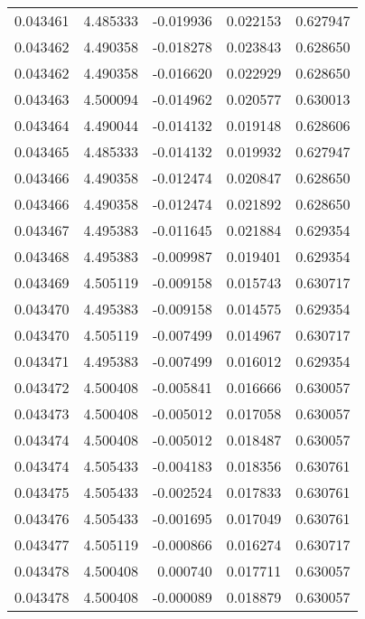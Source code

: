 \begin{tabular}{lrrrr}
0.043461    &  4.485333 & -0.019936 &  0.022153 &             0.627947 \\
0.043462    &  4.490358 & -0.018278 &  0.023843 &             0.628650 \\
0.043462    &  4.490358 & -0.016620 &  0.022929 &             0.628650 \\
0.043463    &  4.500094 & -0.014962 &  0.020577 &             0.630013 \\
0.043464    &  4.490044 & -0.014132 &  0.019148 &             0.628606 \\
0.043465    &  4.485333 & -0.014132 &  0.019932 &             0.627947 \\
0.043466    &  4.490358 & -0.012474 &  0.020847 &             0.628650 \\
0.043466    &  4.490358 & -0.012474 &  0.021892 &             0.628650 \\
0.043467    &  4.495383 & -0.011645 &  0.021884 &             0.629354 \\
0.043468    &  4.495383 & -0.009987 &  0.019401 &             0.629354 \\
0.043469    &  4.505119 & -0.009158 &  0.015743 &             0.630717 \\
0.043470    &  4.495383 & -0.009158 &  0.014575 &             0.629354 \\
0.043470    &  4.505119 & -0.007499 &  0.014967 &             0.630717 \\
0.043471    &  4.495383 & -0.007499 &  0.016012 &             0.629354 \\
0.043472    &  4.500408 & -0.005841 &  0.016666 &             0.630057 \\
0.043473    &  4.500408 & -0.005012 &  0.017058 &             0.630057 \\
0.043474    &  4.500408 & -0.005012 &  0.018487 &             0.630057 \\
0.043474    &  4.505433 & -0.004183 &  0.018356 &             0.630761 \\
0.043475    &  4.505433 & -0.002524 &  0.017833 &             0.630761 \\
0.043476    &  4.505433 & -0.001695 &  0.017049 &             0.630761 \\
0.043477    &  4.505119 & -0.000866 &  0.016274 &             0.630717 \\
0.043478    &  4.500408 &  0.000740 &  0.017711 &             0.630057 \\
0.043478    &  4.500408 & -0.000089 &  0.018879 &             0.630057 \\

\end{tabular}

